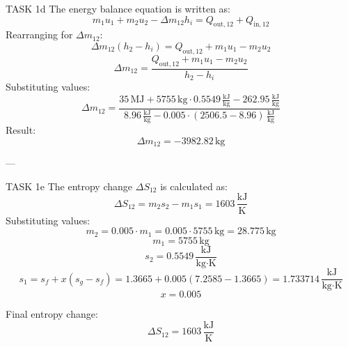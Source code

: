 TASK 1d  
The energy balance equation is written as:  
\[
m_1 u_1 + m_2 u_2 - \Delta m_{12} h_i = Q_{\text{out},12} + Q_{\text{in},12}
\]  
Rearranging for \( \Delta m_{12} \):  
\[
\Delta m_{12} (h_2 - h_i) = Q_{\text{out},12} + m_1 u_1 - m_2 u_2
\]  
\[
\Delta m_{12} = \frac{Q_{\text{out},12} + m_1 u_1 - m_2 u_2}{h_2 - h_i}
\]  
Substituting values:  
\[
\Delta m_{12} = \frac{35 \, \text{MJ} + 5755 \, \text{kg} \cdot 0.5549 \, \frac{\text{kJ}}{\text{kg}} - 262.95 \, \frac{\text{kJ}}{\text{kg}}}{8.96 \, \frac{\text{kJ}}{\text{kg}} - 0.005 \cdot (2506.5 - 8.96) \, \frac{\text{kJ}}{\text{kg}}}
\]  
Result:  
\[
\Delta m_{12} = -3982.82 \, \text{kg}
\]  

---

TASK 1e  
The entropy change \( \Delta S_{12} \) is calculated as:  
\[
\Delta S_{12} = m_2 s_2 - m_1 s_1 = 1603 \, \frac{\text{kJ}}{\text{K}}
\]  
Substituting values:  
\[
m_2 = 0.005 \cdot m_1 = 0.005 \cdot 5755 \, \text{kg} = 28.775 \, \text{kg}
\]  
\[
m_1 = 5755 \, \text{kg}
\]  
\[
s_2 = 0.5549 \, \frac{\text{kJ}}{\text{kg·K}}
\]  
\[
s_1 = s_f + x (s_g - s_f) = 1.3665 + 0.005 (7.2585 - 1.3665) = 1.733714 \, \frac{\text{kJ}}{\text{kg·K}}
\]  
\[
x = 0.005
\]  

Final entropy change:  
\[
\Delta S_{12} = 1603 \, \frac{\text{kJ}}{\text{K}}
\]